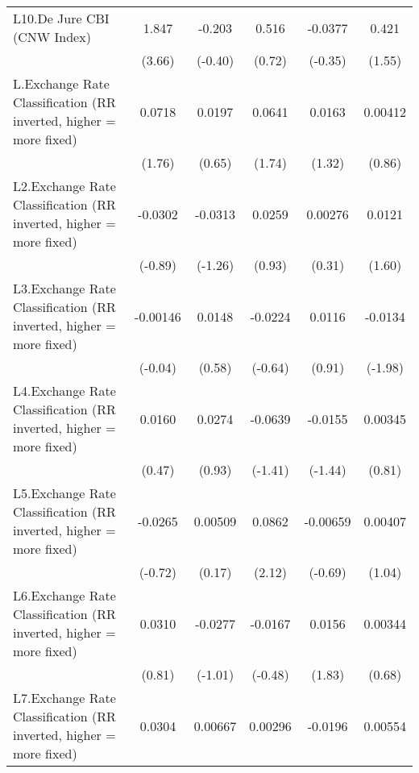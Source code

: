 {\begin{longtable}{l*{5}{c}}
\addlinespace
L10.De Jure CBI (CNW Index)&    1.847\sym{***}&   -0.203         &    0.516         &  -0.0377         &    0.421         \\
                &   (3.66)         &  (-0.40)         &   (0.72)         &  (-0.35)         &   (1.55)         \\
\addlinespace
L.Exchange Rate Classification (RR inverted, higher = more fixed)&   0.0718         &   0.0197         &   0.0641         &   0.0163         &  0.00412         \\
                &   (1.76)         &   (0.65)         &   (1.74)         &   (1.32)         &   (0.86)         \\
\addlinespace
L2.Exchange Rate Classification (RR inverted, higher = more fixed)&  -0.0302         &  -0.0313         &   0.0259         &  0.00276         &   0.0121         \\
                &  (-0.89)         &  (-1.26)         &   (0.93)         &   (0.31)         &   (1.60)         \\
\addlinespace
L3.Exchange Rate Classification (RR inverted, higher = more fixed)& -0.00146         &   0.0148         &  -0.0224         &   0.0116         &  -0.0134\sym{*}  \\
                &  (-0.04)         &   (0.58)         &  (-0.64)         &   (0.91)         &  (-1.98)         \\
\addlinespace
L4.Exchange Rate Classification (RR inverted, higher = more fixed)&   0.0160         &   0.0274         &  -0.0639         &  -0.0155         &  0.00345         \\
                &   (0.47)         &   (0.93)         &  (-1.41)         &  (-1.44)         &   (0.81)         \\
\addlinespace
L5.Exchange Rate Classification (RR inverted, higher = more fixed)&  -0.0265         &  0.00509         &   0.0862\sym{*}  & -0.00659         &  0.00407         \\
                &  (-0.72)         &   (0.17)         &   (2.12)         &  (-0.69)         &   (1.04)         \\
\addlinespace
L6.Exchange Rate Classification (RR inverted, higher = more fixed)&   0.0310         &  -0.0277         &  -0.0167         &   0.0156         &  0.00344         \\
                &   (0.81)         &  (-1.01)         &  (-0.48)         &   (1.83)         &   (0.68)         \\
\addlinespace
L7.Exchange Rate Classification (RR inverted, higher = more fixed)&   0.0304         &  0.00667         &  0.00296         &  -0.0196\sym{*}  &  0.00554         \\

\end{longtable}}
